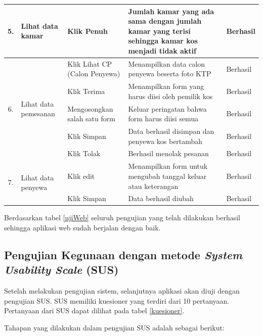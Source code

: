 \begin{longtable}{ |c|p{3cm}|p{3cm}|p{3cm}|p{2cm}|}
		5. & Lihat data kamar & 
		Klik Penuh& Jumlah kamar yang ada sama dengan jumlah kamar yang terisi sehingga kamar kos menjadi tidak aktif & Berhasil \\ \hline
		
		\multirow{5}{*}{6.} & 	\multirow{5}{*}{Lihat data pemesanan} & Klik Lihat CP (Calon Penyewa) & Menampilkan data calon penyewa beserta foto KTP & Berhasil \\ \cline{3-5}
		&& Klik Terima & Menampilkan form yang harus diisi oleh pemilik kos & Berhasil \\ \cline{3-5}
		&& Mengosongkan salah satu form & Keluar peringatan bahwa form harus diisi semua & Berhasil \\ \cline{3-5}
		&& Klik Simpan & Data berhasil disimpan dan penyewa kos bertambah & Berhasil \\ \cline{3-5}
		&& Klik Tolak & Berhasil menolak pesanan & Berhasil \\ \hline
		
		\multirow{2}{*}{7.} & 	\multirow{2}{*}{Lihat data penyewa} & Klik edit & Menampilkan form untuk mengubah tanggal keluar atau keterangan & Berhasil \\ \cline{3-5}
		&& Klik Simpan & Data berhasil diubah & Berhasil \\ \hline
		
	\end{longtable}

	Berdasarkan tabel \ref{ujiWeb} seluruh pengujian yang telah dilakukan berhasil sehingga aplikasi web sudah berjalan dengan baik. 
	
	\subsection{Pengujian Kegunaan dengan metode \textit{System Usability Scale }(SUS)}
	
	Setelah melakukan pengujian sistem, selanjutnya aplikasi akan diuji dengan pengujian SUS. SUS memiliki kuesioner
	yang terdiri dari 10 pertanyaan. Pertanyaan dari SUS dapat dilihat pada tabel \ref{kuesioner}.
	
	Tahapan yang dilakukan dalam pengujian SUS adalah sebagai berikut:
	
